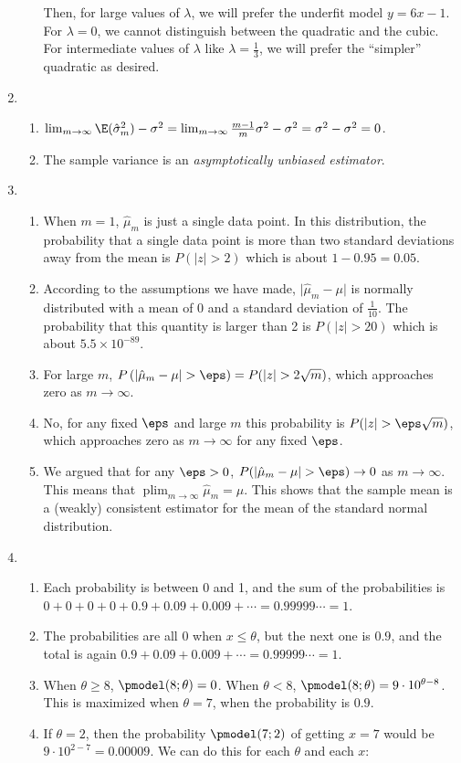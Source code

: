 \documentclass{article}
\DeclareMathOperator*{\plim}{plim}
\begin{document}
\begin{enumerate}
\begin{enumerate}
    Then, for large values of $\lambda$, we will prefer the underfit model $y = 6x - 1$. For $\lambda = 0$, we cannot distinguish between the quadratic and the cubic. For intermediate values of $\lambda$ like $\lambda = \frac13$, we will prefer the ``simpler'' quadratic as desired. 
\end{enumerate}
\item
    \begin{enumerate}
    \item $\lim_{m\to\infty} \E(\hat{\sigma}_m^2) - \sigma^2 = \lim_{m\to\infty} \frac{m-1}{m}\sigma^2 - \sigma^2 = \sigma^2 - \sigma^2 = 0$.
    \item The sample variance is an \emph{asymptotically unbiased estimator}.
    \end{enumerate}
\item
    \begin{enumerate} 
    \item When $m=1$, $\hat{\mu}_m$ is just a single data point. In this distribution, the probability that a single data point is more than two standard deviations away from the mean is $P(|z| > 2)$ which is about $1 -0.95 = 0.05$.
    \item According to the assumptions we have made, $\lvert \hat{\mu}_m - \mu \rvert$ is normally distributed with a mean of 0 and a standard deviation of $\frac{1}{10}$. The probability that this quantity is larger than 2 is $P(|z| > 20)$ which is about $5.5 \times 10^{-89}$.
    \item For large $m$, $P\left(\lvert \hat{\mu}_m - \mu \rvert > \eps \right) = P(|z| > 2 \sqrt{m})$, which approaches zero as $m \to \infty$.
    \item No, for any fixed $\eps$ and large $m$ this probability is $P(|z| > \eps\sqrt{m})$, which approaches zero as $m \to \infty$ for any fixed $\eps$.
    \item We argued that for any $\eps > 0$, $P(\lvert \hat{\mu}_m - \mu \rvert > \eps) \to 0$ as $m \to \infty$. This means that $\plim_{m \to \infty} \hat{\mu}_m = \mu$. This shows that the sample mean is a (weakly) consistent estimator for the mean of the standard normal distribution.
    \end{enumerate}
\item
    \begin{enumerate}
        \item Each probability is between 0 and 1, and the sum of the probabilities is $0 + 0 + 0 + 0 + 0.9 + 0.09 + 0.009 + \cdots = 0.99999\cdots = 1$.
        \item The probabilities are all 0 when $x \leq \theta$, but the next one is $0.9$, and the total is again $0.9 + 0.09 + 0.009 +\cdots = 0.99999\cdots = 1$.
        \item When $\theta \geq 8$, $\pmodel(8; \theta) = 0$. When $\theta < 8$, $\pmodel(8; \theta) = 9\cdot10^{\theta - 8}$. This is maximized when $\theta = 7$, when the probability is $0.9$.
        \item If $\theta = 2$, then the probability $\pmodel(7; 2)$ of getting $x = 7$ would be $9 \cdot 10^{2-7} = 0.00009$. We can do this for each $\theta$ and each $x$:
        

\end{enumerate}
\end{enumerate}
\end{document}
